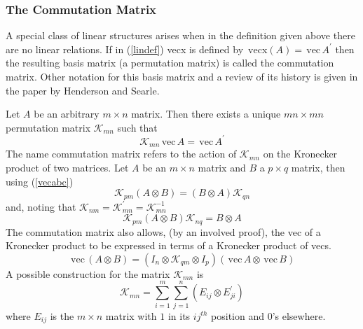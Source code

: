 \documentclass[12pt,thmsa,suthesis,verbatim]{report}
\begin{document}
\subsubsection{The Commutation Matrix}

A special class of linear structures arises when in the definition given
above there are no linear relations. If in (\ref{lindef}) vecx is defined by 
$\,\mathrm{vec}$x$\left( A\right) =\,\mathrm{vec}\,A^{\prime }$ then the
resulting basis matrix (a permutation matrix) is called the commutation
matrix. Other notation for this basis matrix and a review of its history is
given in the paper by Henderson and Searle\cite{HendersonSearle80}.

Let $A$ be an arbitrary $m\times n$ matrix. Then there exists a unique $%
mn\times mn$ permutation matrix $\mathcal{K}_{mn}$ such that 
\begin{equation}
\mathcal{K}_{mn}\,\mathrm{vec}\,A=\,\mathrm{vec}\,A^{\prime }
\end{equation}
The name commutation matrix refers to the action of $\mathcal{K}_{mn}$ on
the Kronecker product of two matrices. Let $A$ be an $m\times n$ matrix and $%
B$ a $p\times q$ matrix, then using (\ref{vecabc}) 
\begin{equation}
\mathcal{K}_{pm}\left( A\otimes B\right) =\left( B\otimes A\right) \mathcal{K%
}_{qn}
\end{equation}
and, noting that $\mathcal{K}_{nm}=\mathcal{K}_{mn}^{\prime }=\mathcal{K}%
_{mn}^{-1}$%
\begin{equation}
\mathcal{K}_{pm}\left( A\otimes B\right) \mathcal{K}_{nq}=B\otimes A
\end{equation}
The commutation matrix also allows, (by an involved proof), the vec of a
Kronecker product to be expressed in terms of a Kronecker product of vecs. 
\begin{equation}
\,\mathrm{vec}\,\left( A\otimes B\right) =\left( I_n\otimes \mathcal{K}%
_{qm}\otimes I_p\right) \left( \,\mathrm{vec}\,A\otimes \,\mathrm{vec}%
\,B\right)
\end{equation}
A possible construction for the matrix $\mathcal{K}_{mn}$ is 
\begin{equation}
\mathcal{K}_{mn}=\sum_{i=1}^m\sum_{j=1}^n\left( E_{ij}\otimes E_{ji}^{\prime
}\right)  \label{conk}
\end{equation}
where $E_{ij}$ is the $m\times n$ matrix with $1$ in its $ij^{th}$ position
and $0$'s elsewhere.
\end{document}
